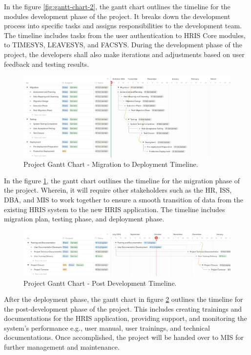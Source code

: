    In the figure \ref{fig:gantt-chart-2}, the gantt chart outlines the timeline for the modules development phase of the project. It breaks down the development process into specific tasks and assigns responsibilities to the development team. The timeline includes tasks from the user authentication to HRIS Core modules, to TIMESYS, LEAVESYS, and FACSYS. During the development phase of the project, the developers shall also make iterations and adjustments based on user feedback and testing results.

    \begin{figure}[H]
        \centering
        \includegraphics[width=1\linewidth]{figures/images/diagrams/gantt/gantt-chart-3.png}
        \caption{Project Gantt Chart - Migration to Deployment Timeline.}
        \label{fig:gantt-chart-3}
    \end{figure}

    In the figure \ref{fig:gantt-chart-3}, the gantt chart outlines the timeline for the migration phase of the project. Wherein, it will require other stakeholders such as the HR, ISS, DBA, and MIS to work together to ensure a smooth transition of data from the existing HRIS system to the new HRIS application. The timeline includes migration plan, testing phase, and deployment phase.

    \begin{figure}[H]
        \centering
        \includegraphics[width=1\linewidth]{figures/images/diagrams/gantt/gantt-chart-4.png}
        \caption{Project Gantt Chart - Post Development Timeline.}
        \label{fig:gantt-chart-4}
    \end{figure}

    After the deployment phase, the gantt chart in figure \ref{fig:gantt-chart-4} outlines the timeline for the post-development phase of the project. This includes creating trainings and documentations for the HRIS application, providing support, and monitoring the system's performance e.g., user manual, user trainings, and technical documentations. Once accomplished, the project will be handed over to MIS for further management and maintenance.

